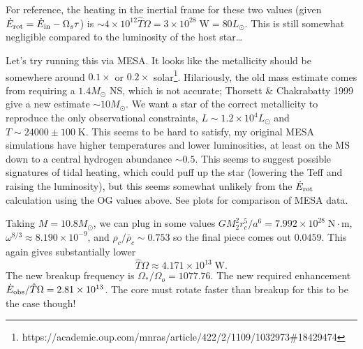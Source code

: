 \documentclass[11pt,
        usenames, %
        dvipsnames %
    ]{article}
\newcommand*{\scinot}[2]{#1\times10^{#2}}
\begin{document}
For reference, the heating in the inertial frame for these two values (given
$\dot{E}_{\rm rot} = \dot{E}_{\rm in} - \Omega_s \tau$) is $\sim \scinot{4}{12}
\hat{T}\Omega = \scinot{3}{28}\;\mathrm{W} = 80L_{\odot}$. This is still
somewhat negligible compared to the luminosity of the host star\dots

Let's try running this via MESA\@. It looks like the metallicity should be
somewhere around $0.1\times$ or $0.2\times$
solar\footnote{https://academic.oup.com/mnras/article/422/2/1109/1032973\#18429474}.
Hilariously, the old mass estimate comes from requiring a $1.4M_{\odot}$ NS,
which is not accurate; Thorsett \& Chakrabatty 1999 give a new estimate $\sim 10
M_{\odot}$. We want a star of the correct metallicity to reproduce the only
observational constraints, $L \sim \scinot{1.2}{4}L_{\odot}$ and $T \sim 24000
\pm 100\;\mathrm{K}$. This seems to be hard to satisfy, my original MESA
simulations have higher temperatures and lower luminosities, at least on the MS
down to a central hydrogen abundance $\sim 0.5$. This seems to suggest possible
signatures of tidal heating, which could puff up the star (lowering the Teff and
raising the luminosity), but this seems somewhat unlikely from the $\dot{E}_{\rm
rot}$ calculation using the OG values above. See plots for comparison of MESA
data. %

Taking $M = 10.8M_{\odot}$, we can plug in some values
$GM_2^2 r_c^5 / a^6 = \scinot{7.992}{28}\;\mathrm{N \cdot m}$,
$\omega^{8/3} \approx \scinot{8.190}{-9}$, and
$\rho_c / \bar{\rho}_c \sim 0.753$ so the final piece comes out $0.0459$. This
again gives substantially lower
\begin{equation}
    \hat{T}\Omega \approx \scinot{4.171}{13}\;\mathrm{W}.
\end{equation}
The new breakup frequency is $\Omega_* / \Omega_o = 1077.76$. The new required
enhancement $\dot{E}_{\rm obs} / \hat{T}\Omega = \scinot{2.81}{13}$. The core
must rotate faster than breakup for this to be the case though!
\end{document}
